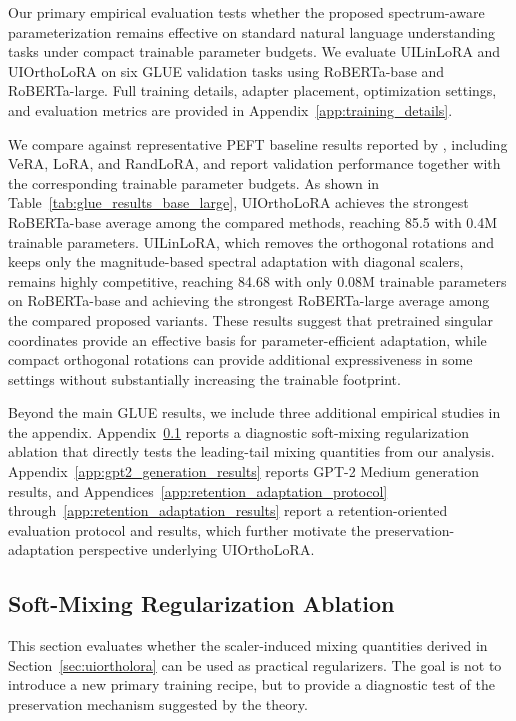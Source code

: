 Our primary empirical evaluation tests whether the proposed spectrum-aware
parameterization remains effective on standard natural language understanding
tasks under compact trainable parameter budgets. We evaluate UILinLoRA and
UIOrthoLoRA on six GLUE validation tasks using RoBERTa-base and RoBERTa-large. Full training
details, adapter placement, optimization settings, and evaluation metrics are
provided in Appendix~\ref{app:training_details}.

We compare against representative PEFT baseline results reported by
\citet{albert2025randlora}, including VeRA, LoRA, and RandLoRA, and report
validation performance together with the corresponding trainable parameter
budgets. As shown in 
Table~\ref{tab:glue_results_base_large}, UIOrthoLoRA achieves the strongest
RoBERTa-base average among the compared methods, reaching 85.5 with 0.4M
trainable parameters. UILinLoRA, which removes the orthogonal rotations and
keeps only the magnitude-based spectral adaptation with diagonal scalers,
remains highly competitive, reaching 84.68 with only 0.08M trainable parameters
on RoBERTa-base and achieving the strongest RoBERTa-large average among the
compared proposed variants. These results suggest that pretrained singular
coordinates provide an effective basis for parameter-efficient adaptation, while
compact orthogonal rotations can provide additional expressiveness in some
settings without substantially increasing the trainable footprint.

Beyond the main GLUE results, we include three additional empirical studies in
the appendix. Appendix~\ref{app:soft_mixing_ablation} reports a diagnostic
soft-mixing regularization ablation that directly tests the leading-tail
mixing quantities from our analysis. Appendix~\ref{app:gpt2_generation_results}
reports GPT-2 Medium generation results, and
Appendices~\ref{app:retention_adaptation_protocol}
through~\ref{app:retention_adaptation_results} report a retention-oriented
evaluation protocol and results, which further motivate the
preservation-adaptation perspective underlying UIOrthoLoRA.

\subsection{Soft-Mixing Regularization Ablation}
\label{app:soft_mixing_ablation}

This section evaluates whether the scaler-induced mixing quantities derived in
Section~\ref{sec:uiortholora} can be used as practical regularizers. The goal is
not to introduce a new primary training recipe, but to provide a diagnostic test
of the preservation mechanism suggested by the theory.

